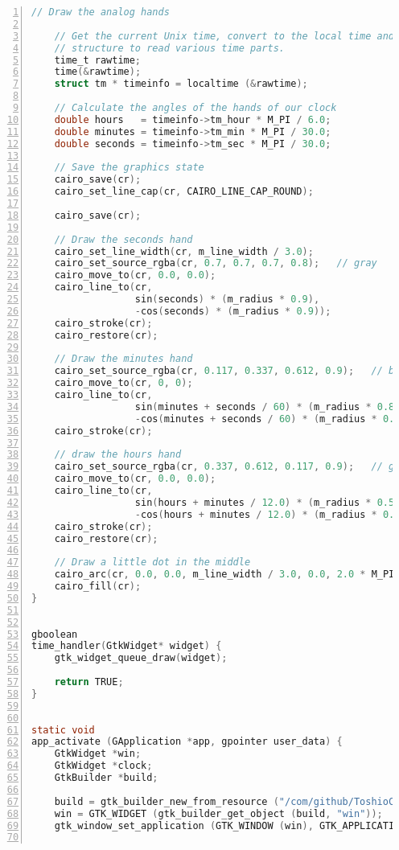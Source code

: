 \begin{lstlisting}[language=C, numbers=left]
    // Draw the analog hands

    // Get the current Unix time, convert to the local time and break into time
    // structure to read various time parts.
    time_t rawtime;
    time(&rawtime);
    struct tm * timeinfo = localtime (&rawtime);

    // Calculate the angles of the hands of our clock
    double hours   = timeinfo->tm_hour * M_PI / 6.0;
    double minutes = timeinfo->tm_min * M_PI / 30.0;
    double seconds = timeinfo->tm_sec * M_PI / 30.0;

    // Save the graphics state
    cairo_save(cr);
    cairo_set_line_cap(cr, CAIRO_LINE_CAP_ROUND);

    cairo_save(cr);

    // Draw the seconds hand
    cairo_set_line_width(cr, m_line_width / 3.0);
    cairo_set_source_rgba(cr, 0.7, 0.7, 0.7, 0.8);   // gray
    cairo_move_to(cr, 0.0, 0.0);
    cairo_line_to(cr,
                  sin(seconds) * (m_radius * 0.9),
                  -cos(seconds) * (m_radius * 0.9));
    cairo_stroke(cr);
    cairo_restore(cr);

    // Draw the minutes hand
    cairo_set_source_rgba(cr, 0.117, 0.337, 0.612, 0.9);   // blue
    cairo_move_to(cr, 0, 0);
    cairo_line_to(cr,
                  sin(minutes + seconds / 60) * (m_radius * 0.8),
                  -cos(minutes + seconds / 60) * (m_radius * 0.8));
    cairo_stroke(cr);

    // draw the hours hand
    cairo_set_source_rgba(cr, 0.337, 0.612, 0.117, 0.9);   // green
    cairo_move_to(cr, 0.0, 0.0);
    cairo_line_to(cr,
                  sin(hours + minutes / 12.0) * (m_radius * 0.5),
                  -cos(hours + minutes / 12.0) * (m_radius * 0.5));
    cairo_stroke(cr);
    cairo_restore(cr);

    // Draw a little dot in the middle
    cairo_arc(cr, 0.0, 0.0, m_line_width / 3.0, 0.0, 2.0 * M_PI);
    cairo_fill(cr);
}


gboolean
time_handler(GtkWidget* widget) {
    gtk_widget_queue_draw(widget);

    return TRUE;
}


static void
app_activate (GApplication *app, gpointer user_data) {
    GtkWidget *win;
    GtkWidget *clock;
    GtkBuilder *build;

    build = gtk_builder_new_from_resource ("/com/github/ToshioCP/tfc/tfc.ui");
    win = GTK_WIDGET (gtk_builder_get_object (build, "win"));
    gtk_window_set_application (GTK_WINDOW (win), GTK_APPLICATION (app));


\end{lstlisting}
